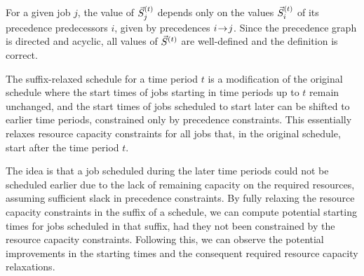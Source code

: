 For a given job $j$, the value of $\vec{S}^{(t)}_{j}$
depends only on the values $\vec{S}^{(t)}_{i}$ of its precedence predecessors $i$,
given by precedences $i \hspace{-0.2em} \rightarrow \hspace{-0.2em} j$.
Since the precedence graph is directed and acyclic,
all values of $\vec{S}^{(t)}$ are well-defined and the definition is correct.

The suffix-relaxed schedule for a time period $t$ is a modification of the original schedule
where the start times of jobs starting in time periods up to $t$ remain unchanged,
and the start times of jobs scheduled to start later can be shifted to earlier time periods,
constrained only by precedence constraints.
This essentially relaxes resource capacity constraints for all jobs that, in the original schedule,
start after the time period $t$.

The idea is that a job scheduled during the later time periods could not be scheduled earlier
due to the lack of remaining capacity on the required resources,
assuming sufficient slack in precedence constraints.
By fully relaxing the resource capacity constraints in the suffix of a schedule,
we can compute potential starting times for jobs scheduled in that suffix,
had they not been constrained by the resource capacity constraints.
Following this, we can observe the potential improvements in the starting times
and the consequent required resource capacity relaxations.

